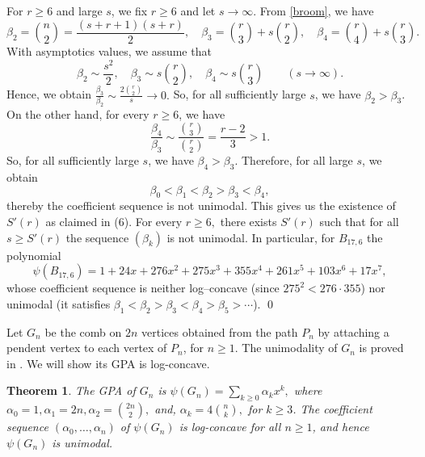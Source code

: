 \documentclass[12pt,twoside]{article}
\newtheorem{theorem}{Theorem}[section]
\renewenvironment{proof}{{\noindent\bfseries Proof.}}{\qed}
\begin{document}
\begin{proof}
	For $r\ge 6$ and large $s$, we fix $r\ge 6$ and let $s\to\infty$. From \eqref{broom}, we have
	\[
	\beta_2=\binom{n}{2}=\frac{(s+r+1)(s+r)}{2},\quad
	\beta_3=\binom{r}{3}+s\binom{r}{2},\quad
	\beta_4=\binom{r}{4}+s\binom{r}{3}.
	\]
	With asymptotics values, we assume that 
	\[
	\beta_2 \sim \frac{s^2}{2},\quad
	\beta_3 \sim s\binom{r}{2},\quad
	\beta_4 \sim s\binom{r}{3}\qquad (s\to\infty).
	\]
	Hence, we obtain	$\frac{\beta_3}{\beta_2} \sim \tfrac{2\binom{r}{2}}{s}\to 0.$
	So, for all sufficiently large $s$, we have $\beta_2>\beta_3$. On the other hand, for every $r\ge 6$, we have
	\[
	\frac{\beta_4}{\beta_3} \sim \frac{\binom{r}{3}}{\binom{r}{2}} = \frac{r-2}{3} > 1.
	\]
	So, for all sufficiently large $s$, we have $\beta_4>\beta_3$. Therefore, for all large $s$, we obtain
	\[
	\beta_0<\beta_1<\beta_2>\beta_3<\beta_4,
	\]
	thereby the coefficient sequence is not unimodal. This gives us the existence of $S'(r)$ as claimed in (6).  For every $r\ge 6,$ there exists $S'(r)$ such that for all $s\ge S'(r)$ the sequence $(\beta_k)$ is not unimodal. In particular, for
	$B_{17,6}$ the polynomial 
	\[
	\psi(B_{17,6}) = 1 + 24x + 276x^2 + 275x^3 + 355x^4 + 261x^5 + 103x^6 + 17x^7,
	\]
	whose coefficient sequence is neither log–concave (since $275^2 < 276\cdot 355$) nor unimodal (it satisfies
	$\beta_1<\beta_2>\beta_3<\beta_4>\beta_5>\cdots$).
\end{proof}

	
		
		
		
		Let $G_n$ be the comb on $2n$ vertices obtained from the path $P_n$ by
		attaching a pendent vertex to each vertex of $P_n$, for $n\ge 1$. The unimodality of $G_{n}$ is proved in \cite[Theorem 4.1]{0}. We will show its GPA is log-concave.		
		\begin{theorem}\label{thm:comb-unimodal-correct}
			The GPA of $G_n$  is $\psi(G_n)=\sum_{k\ge 0} \alpha_k x^k,$ where $\alpha_0 = 1,  \alpha_1 = 2n,  \alpha_2 = \binom{2n}{2},$ 	and,  $\alpha_k = 4\binom{n}{k},$ for $k\ge 3$.  The coefficient sequence $(\alpha_0,\dots,\alpha_n)$ of $\psi(G_n)$ is log-concave for all  $n\ge 1$, and hence $\psi(G_n)$ is unimodal.
		\end{theorem}
		
\end{document}

